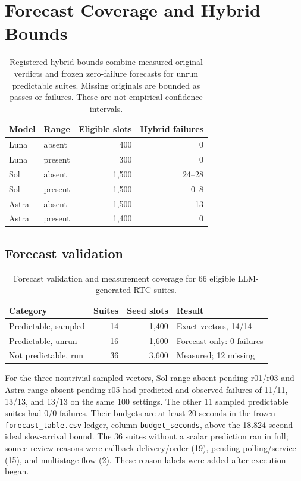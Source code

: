 \section{Forecast Coverage and Hybrid Bounds}\label{app:hybrid}
\begin{table}[t]
\caption{Registered hybrid bounds combine measured original verdicts and frozen zero-failure forecasts for unrun predictable suites. Missing originals are bounded as passes or failures. These are not empirical confidence intervals.}
\label{tab:hybrid}
\small
\begin{tabular}{@{}llrr@{}}
\toprule
Model & Range & Eligible slots & Hybrid failures \\
\midrule
Luna & absent & 400 & 0 \\
Luna & present & 300 & 0 \\
Sol & absent & 1,500 & 24--28 \\
Sol & present & 1,500 & 0--8 \\
Astra & absent & 1,500 & 13 \\
Astra & present & 1,400 & 0 \\
\bottomrule
\end{tabular}
\end{table}

\subsection{Forecast validation}\label{app:forecast}
\begin{table}[t]
\caption{Forecast validation and measurement coverage for 66 eligible LLM-generated RTC suites.}
\label{tab:forecast}
\small
\begin{tabular}{@{}lrrl@{}}
\toprule
Category & Suites & Seed slots & Result \\
\midrule
Predictable, sampled & 14 & 1,400 & Exact vectors, 14/14 \\
Predictable, unrun & 16 & 1,600 & Forecast only: 0 failures \\
Not predictable, run & 36 & 3,600 & Measured; 12 missing \\
\bottomrule
\end{tabular}
\end{table}

For the three nontrivial sampled vectors, Sol range-absent pending r01/r03 and Astra range-absent pending r05 had predicted and observed failures of 11/11, 13/13, and 13/13 on the same 100 settings. The other 11 sampled predictable suites had 0/0 failures. Their budgets are at least 20 seconds in the frozen \texttt{forecast\_table.csv} ledger, column \texttt{budget\_seconds}, above the 18.824-second ideal slow-arrival bound. The 36 suites without a scalar prediction ran in full; source-review reasons were callback delivery/order (19), pending polling/service (15), and multistage flow (2). These reason labels were added after execution began.

